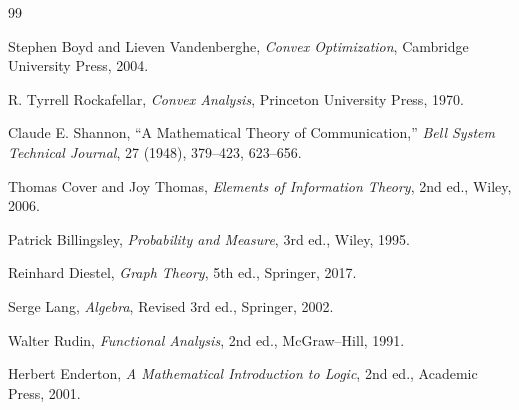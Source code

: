 \documentclass[11pt,oneside]{book}
\numberwithin{equation}{chapter}
\theoremstyle{definition}
\theoremstyle{plain}
\begin{document}
\begin{thebibliography}{99}

Stephen Boyd and Lieven Vandenberghe,
\emph{Convex Optimization},
Cambridge University Press,
2004.

R. Tyrrell Rockafellar,
\emph{Convex Analysis},
Princeton University Press,
1970.


Claude E. Shannon,
``A Mathematical Theory of Communication,''
\emph{Bell System Technical Journal},
27 (1948),
379--423, 623--656.

Thomas Cover and Joy Thomas,
\emph{Elements of Information Theory},
2nd ed.,
Wiley,
2006.


Patrick Billingsley,
\emph{Probability and Measure},
3rd ed.,
Wiley,
1995.


Reinhard Diestel,
\emph{Graph Theory},
5th ed.,
Springer,
2017.


Serge Lang,
\emph{Algebra},
Revised 3rd ed.,
Springer,
2002.


Walter Rudin,
\emph{Functional Analysis},
2nd ed.,
McGraw--Hill,
1991.


Herbert Enderton,
\emph{A Mathematical Introduction to Logic},
2nd ed.,
Academic Press,
2001.


\end{thebibliography}
\end{document}
